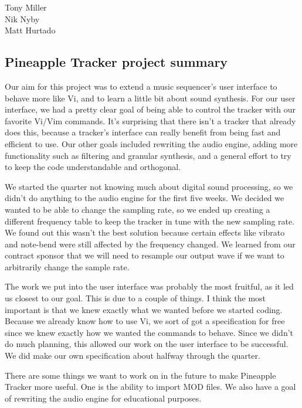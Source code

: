 \documentclass[12pt,letterpaper]{article}
\begin{document}
\begin{flushright}
Tony Miller\\
Nik Nyby\\
Matt Hurtado
\end{flushright}

\begin{center}
\section*{Pineapple Tracker project summary}
\end{center}


\doublespacing
\par
Our aim for this project was to extend a music sequencer's user interface to behave more like Vi, and to learn a little bit about sound synthesis. For our user interface, we had a pretty clear goal of being able to control the tracker with our favorite Vi/Vim commands. It's surprising that there isn't a tracker that already does this, because a tracker's interface can really benefit from being fast and efficient to use. Our other goals included rewriting the audio engine, adding more functionality such as filtering and granular synthesis, and a general effort to try to keep the code understandable and orthogonal.

\par
We started the quarter not knowing much about digital sound processing, so we didn't do anything to the audio engine for the first five weeks. We decided we wanted to be able to change the sampling rate, so we ended up creating a different frequency table to keep the tracker in tune with the new sampling rate. We found out this wasn't the best solution because certain effects like vibrato and note-bend were still affected by the frequency changed. We learned from our contract sponsor that we will need to resample our output wave if we want to arbitrarily change the sample rate.

\par
The work we put into the user interface was probably the most fruitful, as it led us closest to our goal. This is due to a couple of things. I think the most important is that we knew exactly what we wanted before we started coding. Because we already know how to use Vi, we sort of got a specification for free since we knew exactly how we wanted the commands to behave. Since we didn't do much planning, this allowed our work on the user interface to be successful. We did make our own specification about halfway through the quarter.

\par
There are some things we want to work on in the future to make Pineapple Tracker more useful. One is the ability to import MOD files. We also have a goal of rewriting the audio engine for educational purposes.
\end{document}

